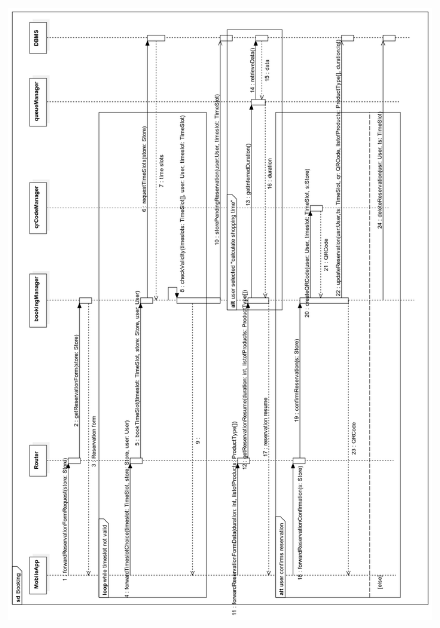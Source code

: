 \documentclass{article}
\begin{document}
\begin{figure}[H]
  \includegraphics[width=\linewidth]{BookingRT.png}
  
\end{figure}
\newpage
\end{document}

